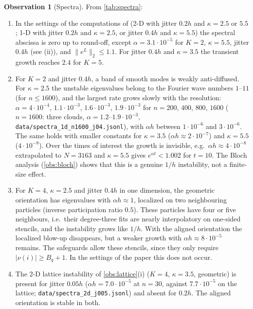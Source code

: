 \documentclass[11pt,a4paper]{article}
\theoremstyle{plain}
\theoremstyle{definition}
\newtheorem{observation}[theorem]{Observation}
\theoremstyle{remark}
\numberwithin{equation}{section}
\newcommand{\nb}{\nu}
\newcommand{\A}[1]{\cite[#1]{Addendum}}
\begin{document}
\begin{observation}[Spectra]\label{obs:spectra}
From \cref{tab:spectra}:
\begin{enumerate}[label=(\roman*)]
\item In the settings of the computations of \cite{JungMUSCL2026} (2-D with jitter $0.2h$ and $\kappa=2.5$ or $5.5$; 1-D with jitter $0.2h$ and $\kappa=2.5$, or jitter $0.4h$ and $\kappa=5.5$) the spectral abscissa is zero up to round-off, except $\alpha=3.1\cdot10^{-5}$ for $K=2$, $\kappa=5.5$, jitter $0.4h$ (see (ii)), and $\|e^{L}\|_2\le1.1$. For jitter $0.4h$ and $\kappa=3.5$ the transient growth reaches $2.4$ for $K=5$.
\item For $K=2$ and jitter $0.4h$, a band of smooth modes is weakly anti-diffused. For $\kappa=2.5$ the unstable eigenvalues belong to the Fourier wave numbers $1$--$11$ (for $n\le1600$), and the largest rate grows slowly with the resolution: $\alpha=4\cdot10^{-4}$, $1.1\cdot10^{-3}$, $1.6\cdot10^{-3}$, $1.9\cdot10^{-3}$ for $n=200$, $400$, $800$, $1600$ ($n=1600$: three clouds, $\alpha=1.2$--$1.9\cdot10^{-3}$, \texttt{data/spectra\_1d\_n1600\_j04.jsonl}), with $\alpha h$ between $1\cdot10^{-6}$ and $3\cdot10^{-6}$. The same holds with smaller constants for $\kappa=3.5$ ($\alpha h\approx2\cdot10^{-7}$) and $\kappa=5.5$ ($4\cdot10^{-8}$). Over the times of interest the growth is invisible, e.g.\ $\alpha h\approx4\cdot10^{-8}$ extrapolated to $N=3163$ and $\kappa=5.5$ gives $e^{\alpha t}<1.002$ for $t=10$. The Bloch analysis (\cref{obs:bloch}) shows that this is a genuine $1/h$ instability, not a finite-size effect.
\item For $K=4$, $\kappa=2.5$ and jitter $0.4h$ in one dimension, the geometric orientation has eigenvalues with $\alpha h\approx1$, localized on two neighbouring particles (inverse participation ratio $0.5$). These particles have four or five neighbours, i.e.\ their degree-three fits are nearly interpolatory on one-sided stencils, and the instability grows like $1/h$. With the aligned orientation the localized blow-up disappears, but a weaker growth with $\alpha h\approx8\cdot10^{-5}$ remains. The safeguards \A{Rem.~3.10} allow these stencils, since they only require $|\nb(i)|\ge B_q+1$. In the settings of the paper this does not occur.
\item The 2-D lattice instability of \cref{obs:lattice}(i) ($K=4$, $\kappa=3.5$, geometric) is present for jitter $0.05h$ ($\alpha h=7.0\cdot10^{-5}$ at $n=30$, against $7.7\cdot10^{-5}$ on the lattice; \texttt{data/spectra\_2d\_j005.jsonl}) and absent for $0.2h$. The aligned orientation is stable in both.
\end{enumerate}
\end{observation}
\end{document}
